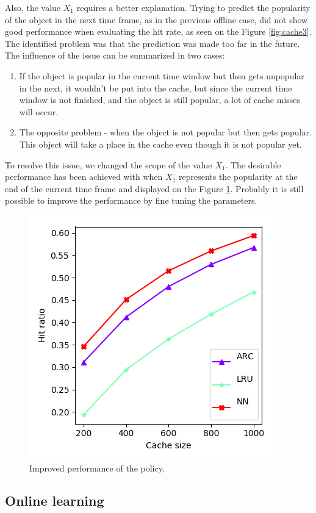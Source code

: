 Also, the value $X_1$ requires a better explanation. Trying to predict the popularity of the object in the next time frame, as in the previous offline case, did not show good performance when evaluating the hit rate, as seen on the Figure \ref{fig:cache3}. The identified problem was that the prediction was made too far in the future. The influence of the issue can be summarized in two cases:

\begin{enumerate}
	\item If the object is popular in the current time window but then gets unpopular in the next, it wouldn't be put into the cache, but since the current time window is not finished, and the object is still popular, a lot of cache misses will occur.
	\item The opposite problem - when the object is not popular but then gets popular. This object will take a place in the cache even though it is not popular yet.
\end{enumerate}

To resolve this issue, we changed the scope of the value $X_1$. The desirable performance has been achieved with when $X_1$ represents the popularity at the end of the current time frame and displayed on the Figure \ref{fig:cache4}. Probably it is still possible to improve the performance by fine tuning the parameters. 

\begin{figure}[h!]
	\centering
	\includegraphics[width=0.5\linewidth]{pics/cache4.png}
	\caption{Improved performance of the policy.}
	\label{fig:cache4}
\end{figure}

\subsection{Online learning}

